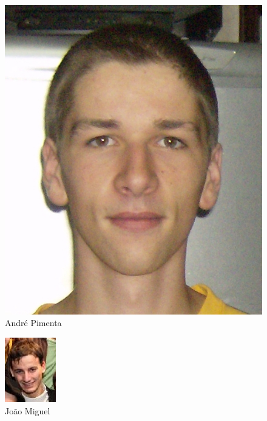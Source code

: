 \documentclass[a4paper,11pt,openright,openbib]{report}
\begin{document}
\begin{figure}[!htb]
     \centering
     \includegraphics[scale=0.13]{imagens/apr.jpg}
     \caption{André Pimenta}
     \label{André Pimenta}
\end{figure}
\begin{figure}[!htb]
     \centering
     \includegraphics[scale=0.6]{imagens/jmbg.png}
     \caption{João Miguel}
     \label{João Miguel}
\end{figure}
\end{document}
